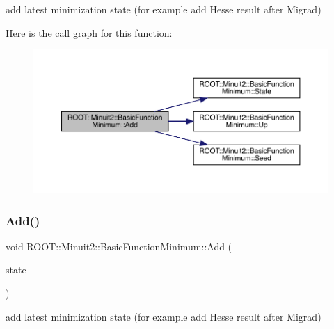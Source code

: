 add latest minimization state (for example add Hesse result after Migrad) 

Here is the call graph for this function\+:
\nopagebreak
\begin{figure}[H]
\begin{center}
\leavevmode
\includegraphics[width=350pt]{de/d25/classROOT_1_1Minuit2_1_1BasicFunctionMinimum_abd32f932e7a26883723b33c4a1402a85_cgraph}
\end{center}
\end{figure}
\mbox{\label{classROOT_1_1Minuit2_1_1BasicFunctionMinimum_abd32f932e7a26883723b33c4a1402a85}} 
\subsubsection{\texorpdfstring{Add()}{Add()}\hspace{0.1cm}{\footnotesize\ttfamily [2/3]}}
{\footnotesize\ttfamily void R\+O\+O\+T\+::\+Minuit2\+::\+Basic\+Function\+Minimum\+::\+Add (\begin{DoxyParamCaption}\item[{const \mbox{\hyperlink{classROOT_1_1Minuit2_1_1MinimumState}{Minimum\+State}} \&}]{state }\end{DoxyParamCaption})\hspace{0.3cm}{\ttfamily [inline]}}



add latest minimization state (for example add Hesse result after Migrad) 

